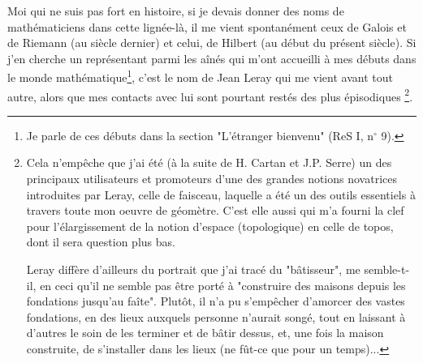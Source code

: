 Moi qui ne suis pas fort en histoire, si je devais donner des noms de mathématiciens dans cette lignée-là, il me vient spontanément ceux de Galois et de Riemann (au siècle dernier) et celui, de Hilbert (au début du présent siècle). Si j'en cherche un représentant parmi les aînés qui m'ont accueilli à mes débuts dans le monde mathématique\footnote{Je parle de ces débuts dans la section "L'étranger bienvenu" (ReS I, n$^{\circ}$ 9).}, c'est le nom de Jean Leray qui me vient avant tout autre, alors que mes contacts avec lui sont pourtant restés des plus épisodiques \footnote{Cela n'empêche que j'ai été (à la suite de H. Cartan et J.P. Serre) un des principaux utilisateurs et promoteurs d'une des grandes notions novatrices introduites par Leray, celle de faisceau, laquelle a été un des outils essentiels à travers toute mon oeuvre de géomètre. C'est elle aussi qui m'a fourni la clef pour l'élargissement de la notion d'espace (topologique) en celle de topos, dont il sera question plus bas.

Leray diffère d'ailleurs du portrait que j'ai tracé du "bâtisseur", me semble-t-il, en ceci qu'il ne semble pas être porté à "construire des maisons depuis les fondations jusqu'au faîte". Plutôt, il n'a pu s'empêcher d'amorcer des vastes fondations, en des lieux auxquels personne n'aurait songé, tout en laissant à d'autres le soin de les terminer et de bâtir dessus, et, une fois la maison construite, de s'installer dans les lieux (ne fût-ce que pour un temps)...}.

